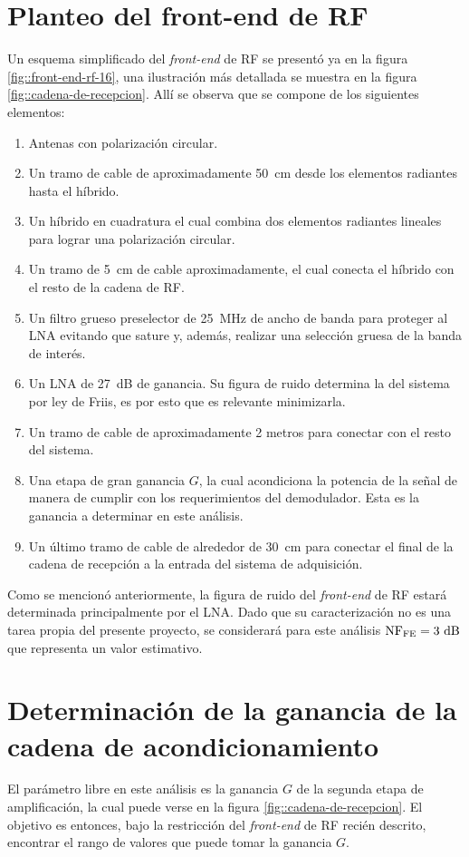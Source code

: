 \documentclass[../../main.tex]{subfiles}
\begin{document}
\section{Planteo del front-end de RF}
Un esquema simplificado del \textit{front-end} de RF se presentó ya en la figura \ref{fig::front-end-rf-16}, una ilustración más detallada  se muestra en la figura \ref{fig::cadena-de-recepcion}. Allí se observa que se compone de los siguientes elementos:
\begin{enumerate}
    \item Antenas con polarización circular.
    \item Un tramo de cable de aproximadamente 50~cm desde los elementos radiantes hasta el híbrido.
    \item Un híbrido en cuadratura el cual combina dos elementos radiantes lineales para lograr una polarización circular.
    \item Un tramo de 5~cm de cable aproximadamente, el cual conecta el híbrido con el resto de la cadena de RF.
    \item Un filtro grueso preselector de 25~MHz de ancho de banda para proteger al LNA evitando que sature y, además, realizar una selección gruesa de la banda de interés.
    \item Un LNA de 27~dB de ganancia. Su figura de ruido determina la del sistema por ley de Friis, es por esto que es relevante minimizarla.
    \item Un tramo de cable de aproximadamente 2 metros para conectar con el resto del sistema.
    \item Una etapa de gran ganancia $G$, la cual acondiciona la potencia de la señal de manera de cumplir con los requerimientos del demodulador. Esta es la ganancia a determinar en este análisis.
    \item Un último tramo de cable de alrededor de 30~cm para conectar el final de la cadena de recepción a la entrada del sistema de adquisición.
\end{enumerate}

Como se mencionó anteriormente, la figura de ruido del \textit{front-end} de RF estará determinada principalmente por el LNA. Dado que su caracterización no es una tarea propia del presente proyecto, se considerará para este análisis $\textrm{NF}_\textrm{FE} = 3~\textrm{dB}$ que representa un valor estimativo.


\section{Determinación de la ganancia de la cadena de acondicionamiento}
El parámetro libre en este análisis es la ganancia $G$ de la segunda etapa de amplificación, la cual puede verse en la figura \ref{fig::cadena-de-recepcion}. El objetivo es entonces, bajo la restricción del \textit{front-end} de RF recién descrito, encontrar el rango de valores que puede tomar la ganancia $G$.
\end{document}
